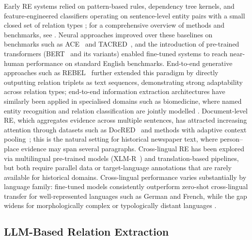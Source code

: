\documentclass[
]{ceurart}
\theoremstyle{definition}
\begin{document}
Early RE systems relied on pattern-based rules, dependency tree kernels, and feature-engineered classifiers operating on sentence-level entity pairs with a small closed set of relation types \citep{zhou-etal-2005-exploring}; for a comprehensive overview of methods and benchmarks, see \citet{zhao2024comprehensive}.
Neural approaches \citep{lin-etal-2016-neural} improved over these baselines on benchmarks such as ACE~\citep{doddington-etal-2004-automatic} and TACRED~\citep{stoica-etal-2021-re-tacred}, and the introduction of pre-trained transformers (BERT~\citep{devlin2019bert} and its variants) enabled fine-tuned systems to reach near-human performance on standard English benchmarks.
End-to-end generative approaches such as REBEL~\citep{huguet-cabot-navigli-2021-rebel-relation} further extended this paradigm by directly outputting relation triplets as text sequences, demonstrating strong adaptability across relation types; end-to-end information extraction architectures have similarly been applied in specialised domains such as biomedicine, where named entity recognition and relation classification are jointly modelled \citep{keinan2025named}.
Document-level RE, which aggregates evidence across multiple sentences, has attracted increasing attention through datasets such as DocRED~\citep{yao-etal-2019-docred} and methods with adaptive context pooling~\citep{zhou2021document}; this is the natural setting for historical newspaper text, where person--place evidence may span several paragraphs.
Cross-lingual RE has been explored via multilingual pre-trained models (XLM-R~\citep{conneau-etal-2020-unsupervised}) and translation-based pipelines, but both require parallel data or target-language annotations that are rarely available for historical domains.
Cross-lingual performance varies substantially by language family: fine-tuned models consistently outperform zero-shot cross-lingual transfer for well-represented languages such as German and French, while the gap widens for morphologically complex or typologically distant languages \citep{hennig2023multitacred,artetxe2020translation}.

\subsection{LLM-Based Relation Extraction}
\end{document}
